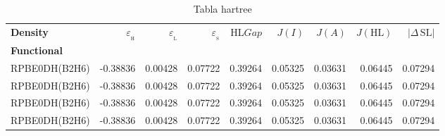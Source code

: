 \documentclass[preprint,landscape,12pt]{elsarticle}
\begin{document}
	\begin{table}
		\caption{ Tabla hartree}
		\centering
		\footnotesize
		\begin{tabular}{lrrrrrrrr}
			\hline
			\textbf{Density}    & $\varepsilon_{_{\mathrm{H}}}$	& $\varepsilon_{_{\mathrm{L}}}$  & $\varepsilon_{_{\mathrm{S}}}$& HL$Gap$ & $J(I)$ & $J(A)$ & $J(\mathrm{HL})$  & \textbf{$\left|\Delta\,\mathrm{SL}\right|$}  \\
			\textbf{Functional} &   &  &     &   &  &  &  &  \\
			\hline \hline 

RPBE0DH(B2H6) & -0.38836 & 0.00428 & 0.07722 & 0.39264 & 0.05325 & 0.03631 & 0.06445 & 0.07294\\
RPBE0DH(B2H6) & -0.38836 & 0.00428 & 0.07722 & 0.39264 & 0.05325 & 0.03631 & 0.06445 & 0.07294\\
RPBE0DH(B2H6) & -0.38836 & 0.00428 & 0.07722 & 0.39264 & 0.05325 & 0.03631 & 0.06445 & 0.07294\\
RPBE0DH(B2H6) & -0.38836 & 0.00428 & 0.07722 & 0.39264 & 0.05325 & 0.03631 & 0.06445 & 0.07294\\

	 		\hline
		\end{tabular}
			\label{tab:hartree}
	\end{table}
\end{document}
